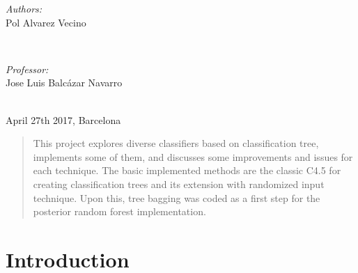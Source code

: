 \documentclass[a4paper,10pt]{article}
\begin{document}
\begin{titlepage}
         \begin{minipage}[t]{0.55\textwidth}
           \begin{flushleft}%
             \emph{Authors:}\\
             Pol Alvarez Vecino \\
           \end{flushleft}
         \end{minipage}
         ~
         \begin{minipage}[t]{0.4\textwidth}
           \begin{flushright}%
             \emph{Professor:} \\
             Jose Luis Balcázar Navarro
           \end{flushright}
         \end{minipage}\\[1.5cm]

         {April 27th 2017, Barcelona}\\[3cm] %
         \vfill %

\end{titlepage}
\tableofcontents

\newpage

\begin{abstract}

This project explores diverse classifiers based on classification tree, implements some of them, and discusses some improvements and issues for each technique. The basic implemented methods are the classic C4.5 for creating classification trees and its extension with randomized input technique. Upon this, tree bagging was coded as a first step for the posterior random forest implementation. 

\end{abstract}





\section{Introduction}
\end{document}
